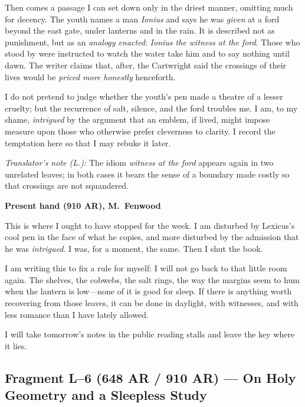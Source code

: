 \documentclass[11pt]{article}
\begin{document}
Then comes a passage I can set down only in the driest manner, omitting much for decency. The youth names a man \textit{Ionius} and says he was \emph{given} at a ford beyond the east gate, under lanterns and in the rain. It is described not as punishment, but as an \emph{analogy enacted}: \textit{Ionius the witness at the ford}. Those who stood by were instructed to watch the water take him and to say nothing until dawn. The writer claims that, after, the Cartwright said the crossings of their lives would be \emph{priced more honestly} henceforth.

I do not pretend to judge whether the youth’s pen made a theatre of a lesser cruelty; but the recurrence of salt, silence, and the ford troubles me. I am, to my shame, \emph{intrigued} by the argument that an emblem, if lived, might impose measure upon those who otherwise prefer cleverness to clarity. I record the temptation here so that I may rebuke it later.

\medskip
\noindent\textit{Translator’s note (L.):} The idiom \textit{witness at the ford} appears again in two unrelated leaves; in both cases it bears the sense of a boundary made costly so that crossings are not squandered.

\medskip
\noindent\textbf{Present hand (910 AR), M.\ Fenwood}

This is where I ought to have stopped for the week. I am disturbed by Lexicus’s cool pen in the face of what he copies, and more disturbed by the admission that he was \emph{intrigued}. I was, for a moment, the same. Then I shut the book.

I am writing this to fix a rule for myself: I will not go back to that little room again. The shelves, the cobwebs, the salt rings, the way the margins seem to hum when the lantern is low—none of it is good for sleep. If there is anything worth recovering from those leaves, it can be done in daylight, with witnesses, and with less romance than I have lately allowed. 

I will take tomorrow’s notes in the public reading stalls and leave the key where it lies.

\subsection*{Fragment L--6 (648 AR / 910 AR) --- On Holy Geometry and a Sleepless Study}
\label{frag:l6}
{}
\end{document}

